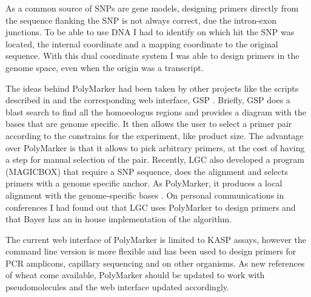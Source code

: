 As a common source of SNPs are gene models, designing primers directly from the sequence flanking the SNP is not always correct, due the intron-exon junctions. 
To be able to use DNA I had to identify on which hit the SNP was located, the internal coordinate and a mapping coordinate to the original sequence. 
With this dual coordinate system I was able to design primers in the genome space, even when the origin was a transcript. 




The ideas behind PolyMarker had been taken by other projects like the scripts described in \cite{Ma2015} and the corresponding web interface, GSP \citep{Wang2016}. 
Briefly, GSP does a blast search to find all the homoeologus regions and provides a diagram with the bases that are genome specific. 
It then allows the user to select a primer pair according to the constrains for the experiment, like product size. 
The advantage over PolyMarker is that it allows to pick arbitrary primers, at the cost of having a step for manual selection of the pair. 
Recently, LGC also developed a program (MAGICBOX) that require a SNP sequence, does the alignment and selects primers with a genome specific anchor. 
As PolyMarker, it produces a local alignment with the genome-specific bases \citep{Curry2016}. 
On personal communications in conferences I had found out that LGC uses PolyMarker to design primers and that Bayer has an in house implementation of the algorithm. 



The current web interface of PolyMarker is limited to KASP assays, however the command line version is more flexible and has been used to design primers for PCR amplicons, capillary sequencing and on other organisms. 
As new references of wheat come available, PolyMarker should be updated to work with pseudomolecules and the web interface updated accordingly.  


 


